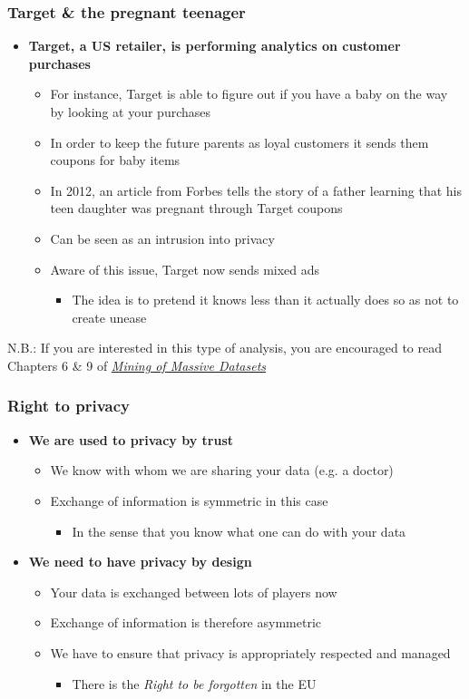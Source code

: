\documentclass{beamer}
\begin{document}
\begin{frame}\frametitle{Target \& the pregnant teenager}
\begin{itemize}
	\setlength\itemsep{1em}
	\item {\bf Target, a US retailer, is performing analytics on customer purchases}
	\begin{itemize}
		\item For instance, Target is able to figure out if you have a baby on the way by looking at your purchases
		\item In order to keep the future parents as loyal customers it sends them coupons for baby items
		\item In 2012, an article from Forbes tells the story of a father learning that his teen daughter was pregnant through Target coupons
		\item Can be seen as an intrusion into privacy
		\item Aware of this issue, Target now sends mixed ads
		\begin{itemize}
			\item The idea is to pretend it knows less than it actually does so as not to create unease 
		\end{itemize}
	\end{itemize}
\end{itemize}
N.B.: If you are interested in this type of analysis, you are encouraged to read Chapters 6 \& 9 of \textit{\href{http://www.mmds.org/}{Mining of Massive Datasets}}
\end{frame}

\begin{frame}\frametitle{Right to privacy}
\begin{itemize}
	\setlength\itemsep{1em}
	\item {\bf We are used to privacy by trust}
	\begin{itemize}
		\item We know with whom we are sharing your data (e.g. a doctor)
		\item Exchange of information is symmetric in this case
		\begin{itemize}
			\item In the sense that you know what one can do with your data
		\end{itemize}
	\end{itemize}
	\item {\bf We need to have privacy by design}
	\begin{itemize}
		\item Your data is exchanged between lots of players now
		\item Exchange of information is therefore asymmetric
		\item We have to ensure that privacy is appropriately respected and managed
		\begin{itemize}
			\item There is the \textit{Right to be forgotten} in the EU
		\end{itemize}
	\end{itemize}
\end{itemize}
\end{frame}
\end{document}
